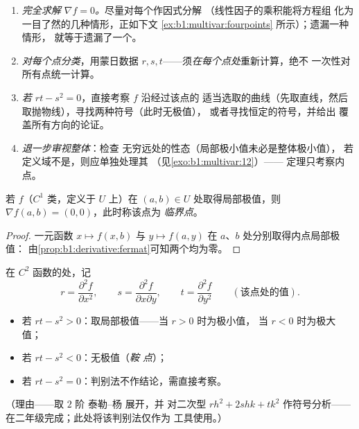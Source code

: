 \begin{method}[有条理的极值研究]
\label{met:b1:multivar:extremamethod}
\begin{enumerate}
  \item \emph{完全求解 $\nabla f = 0$。}尽量对每个作因式分解
        （线性因子的乘积能将方程组
        化为一目了然的几种情形，正如下文
        \cref{ex:b1:multivar:fourpoints} 所示）；遗漏一种情形，
        就等于遗漏了一个。
  \item \emph{对每个点分类}，用蒙日数据 $r, s,
        t$——须\emph{在每个点处}重新计算，绝不
        一次性对所有点统一计算。
  \item \emph{若 $rt - s^2 = 0$}，直接考察 $f$ 沿经过该点的
        适当选取的曲线（先取直线，然后
        取抛物线），寻找两种符号（此时无极值），
        或者寻找恒定的符号，并给出
        覆盖所有方向的论证。
  \item \emph{退一步审视整体}：检查
        无穷远处的性态（局部极小值未必是整体极小值），
        若定义域不是，则应单独处理其
        （见\cref{exo:b1:multivar:12}）——
        定理只考察内点。
\end{enumerate}
\end{method}

\begin{theorem}[临界点]\label{thm:b1:multivar:critical}
若 $f$（$C^1$ 类，定义于 $U$ 上）在 $(a,b)
\in U$ 处取得局部极值，则 $\nabla f(a,b) = (0,0)$，此时称该点为
\emph{临界点}。
\end{theorem}

\begin{proof}
一元函数 $x \mapsto f(x, b)$ 与 $y \mapsto f(a,
y)$ 在 $a$、$b$ 处分别取得内点局部极值：
由\cref{prop:b1:derivative:fermat}可知两个均为零。
\end{proof}

\begin{method}\label{met:b1:multivar:monge}
在 $C^2$ 函数的处，记
\[
r = \frac{\partial^2 f}{\partial x^2},
\qquad
s = \frac{\partial^2 f}{\partial x \partial y},
\qquad
t = \frac{\partial^2 f}{\partial y^2}
\qquad (\text{该点处的值}).
\]
\begin{itemize}
  \item 若 $rt - s^2 > 0$：取局部极值——当 $r > 0$ 时为极小值，
        当 $r < 0$ 时为极大值；
  \item 若 $rt - s^2 < 0$：无极值（\emph{鞍
        点}）；
  \item 若 $rt - s^2 = 0$：判别法不作结论，需直接考察。
\end{itemize}
（理由——取 $2$ 阶 泰勒–杨 展开，并
对二次型 $r h^2 + 2shk + tk^2$ 作符号分析——
在二年级完成；此处将该判别法仅作为
工具使用。）
\end{method}

